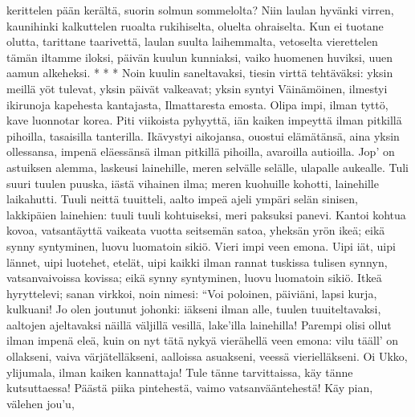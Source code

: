     kerittelen pään kerältä,
    suorin solmun sommelolta?
  \endverse
  \beginverse
    Niin laulan hyvänki virren,
    kaunihinki kalkuttelen
    ruoalta rukihiselta,
    oluelta ohraiselta.
    Kun ei tuotane olutta,
    tarittane taarivettä,
    laulan suulta laihemmalta,
    vetoselta vierettelen
    tämän iltamme iloksi,
    päivän kuulun kunniaksi,
    vaiko huomenen huviksi,
    uuen aamun alkeheksi.
    * * *
  \endverse
  \beginverse
    Noin kuulin saneltavaksi,
    tiesin virttä tehtäväksi:
    yksin meillä yöt tulevat,
    yksin päivät valkeavat;
    yksin syntyi Väinämöinen,
    ilmestyi ikirunoja
    kapehesta kantajasta,
    Ilmattaresta emosta.
  \endverse
  \beginverse
    Olipa impi, ilman tyttö,
    kave luonnotar korea.
    Piti viikoista pyhyyttä,
    iän kaiken impeyttä
    ilman pitkillä pihoilla,
    tasaisilla tanterilla.
    Ikävystyi aikojansa,
    ouostui elämätänsä,
    aina yksin ollessansa,
    impenä eläessänsä
  \endverse
  \beginverse
    ilman pitkillä pihoilla,
    avaroilla autioilla.
    Jop' on astuiksen alemma,
    laskeusi lainehille,
    meren selvälle selälle,
    ulapalle aukealle.
    Tuli suuri tuulen puuska,
    iästä vihainen ilma;
    meren kuohuille kohotti,
    lainehille laikahutti.
  \endverse
  \beginverse
    Tuuli neittä tuuitteli,
    aalto impeä ajeli
    ympäri selän sinisen,
    lakkipäien lainehien:
    tuuli tuuli kohtuiseksi,
    meri paksuksi panevi.
    Kantoi kohtua kovoa,
    vatsantäyttä vaikeata
    vuotta seitsemän satoa,
    yheksän yrön ikeä;
  \endverse
  \beginverse
    eikä synny syntyminen,
    luovu luomatoin sikiö.
    Vieri impi veen emona.
    Uipi iät, uipi lännet,
    uipi luotehet, etelät,
    uipi kaikki ilman rannat
    tuskissa tulisen synnyn,
    vatsanvaivoissa kovissa;
    eikä synny syntyminen,
    luovu luomatoin sikiö.
  \endverse
  \beginverse
    Itkeä hyryttelevi;
    sanan virkkoi, noin nimesi:
    ``Voi poloinen, päiviäni,
    lapsi kurja, kulkuani!
    Jo olen joutunut johonki:
    iäkseni ilman alle,
    tuulen tuuiteltavaksi,
    aaltojen ajeltavaksi
    näillä väljillä vesillä,
    lake'illa lainehilla!
  \endverse
  \beginverse
    Parempi olisi ollut
    ilman impenä eleä,
    kuin on nyt tätä nykyä
    vierähellä veen emona:
    vilu tääll' on ollakseni,
    vaiva värjätelläkseni,
    aalloissa asuakseni,
    veessä vierielläkseni.
    Oi Ukko, ylijumala,
    ilman kaiken kannattaja!
  \endverse
  \beginverse
    Tule tänne tarvittaissa,
    käy tänne kutsuttaessa!
    Päästä piika pintehestä,
    vaimo vatsanvääntehestä!
    Käy pian, välehen jou'u,
